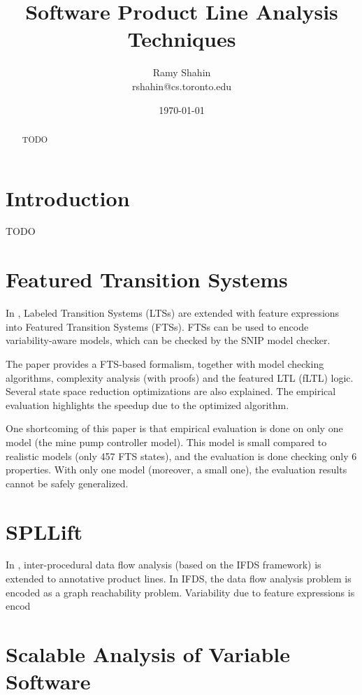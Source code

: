 \documentclass[11pt]{article}
\title{Software Product Line Analysis Techniques}
\author{Ramy Shahin \\ rshahin@cs.toronto.edu}
\date{\today}                                           %
\begin{document}
\maketitle

\begin{abstract}
TODO
\end{abstract}

\section{Introduction}
TODO

\section{Featured Transition Systems}
\cite{Classen:2013}

In \cite{Classen:2013}, Labeled Transition Systems (LTSs) are extended with feature expressions into Featured Transition Systems (FTSs). FTSs can be used to encode variability-aware models, which can be checked by the SNIP model checker. 

The paper provides a FTS-based formalism, together with model checking algorithms, complexity analysis (with proofs) and the featured LTL (fLTL) logic. Several state space reduction optimizations are also explained. The empirical evaluation highlights the speedup due to the optimized algorithm.

One shortcoming of this paper is that empirical evaluation is done on only one model (the mine pump controller model). This model is small compared to realistic models (only 457 FTS states), and the evaluation is done checking only 6 properties. With only one model (moreover, a small one), the evaluation results cannot be safely generalized. 
 
\section{SPLLift}
\cite{Bodden:2013}

In \cite{Bodden:2013}, inter-procedural data flow analysis (based on the IFDS framework) is extended to annotative product lines. In IFDS, the data flow analysis problem is encoded as a graph reachability problem. Variability due to feature expressions is encod 

\section{Scalable Analysis of Variable Software}
\cite{Liebig:2013}
\end{document}
